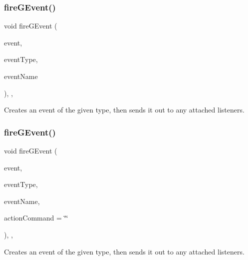 \subsubsection{\texorpdfstring{fire\+G\+Event()}{fireGEvent()}\hspace{0.1cm}{\footnotesize\ttfamily [3/8]}}
{\footnotesize\ttfamily void fire\+G\+Event (\begin{DoxyParamCaption}\item[{Q\+Key\+Event $\ast$}]{event,  }\item[{\mbox{\hyperlink{namespacesgl_a2628ea8d12e8b2563c32f05dc7fff6fa}{Event\+Type}}}]{event\+Type,  }\item[{const std\+::string \&}]{event\+Name }\end{DoxyParamCaption})\hspace{0.3cm}{\ttfamily [protected]}, {\ttfamily [virtual]}, {\ttfamily [inherited]}}



Creates an event of the given type, then sends it out to any attached listeners. 

\mbox{\label{classsgl_1_1GObservable_a119318675d2165bdf7dd853aaf881d4b}} 
\subsubsection{\texorpdfstring{fire\+G\+Event()}{fireGEvent()}\hspace{0.1cm}{\footnotesize\ttfamily [4/8]}}
{\footnotesize\ttfamily void fire\+G\+Event (\begin{DoxyParamCaption}\item[{Q\+Mouse\+Event $\ast$}]{event,  }\item[{\mbox{\hyperlink{namespacesgl_a2628ea8d12e8b2563c32f05dc7fff6fa}{Event\+Type}}}]{event\+Type,  }\item[{const std\+::string \&}]{event\+Name,  }\item[{const std\+::string \&}]{action\+Command = {\ttfamily \char`\"{}\char`\"{}} }\end{DoxyParamCaption})\hspace{0.3cm}{\ttfamily [protected]}, {\ttfamily [virtual]}, {\ttfamily [inherited]}}



Creates an event of the given type, then sends it out to any attached listeners. 

